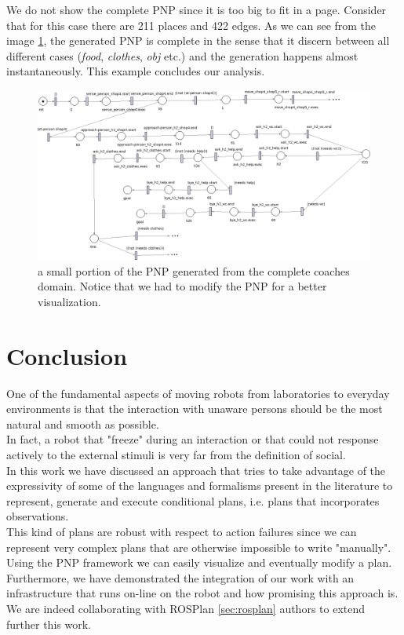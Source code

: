 \documentclass[pdftex,12pt,a4paper]{report}
\begin{document}
\noindent We do not show the complete PNP since it is too big to fit in a page. Consider that for this case there are 211 places and 422 edges. As we can see from the image \ref{fig:rosplan_ex2}, the generated PNP is complete in the sense that it discern between all different cases (\textit{food}, \textit{clothes}, \textit{obj} etc.) and the generation happens almost instantaneously. This example concludes our analysis.

\begin{figure}[H]
	\centering
	\includegraphics[scale=0.5,angle=270, trim=50mm 0mm 0mm 0mm]{images/rosplan_coaches2.png}
	\caption{a small portion of the PNP generated from the complete coaches domain. Notice that we had to modify the PNP for a better visualization.}
	\label{fig:rosplan_ex2}
\end{figure}

\chapter{Conclusion}\label{sec:conclusion}
One of the fundamental aspects of moving robots from laboratories to everyday environments is that the interaction with unaware persons should be the most natural and smooth as possible.\\
In fact, a robot that "freeze" during an interaction or that could not response actively to the external stimuli is very far from the definition of social.\\
In this work we have discussed an approach that tries to take advantage of the expressivity of some of the languages and formalisms present in the literature to represent, generate and execute conditional plans, i.e. plans that incorporates observations.\\
This kind of plans are robust with respect to action failures since we can represent very complex plans that are otherwise impossible to write "manually".
Using the PNP framework we can easily visualize and eventually modify a plan.\\
Furthermore, we have demonstrated the integration of our work with an infrastructure that runs on-line on the robot and how promising this approach is. We are indeed collaborating with ROSPlan \ref{sec:rosplan} authors to extend further this work. 
\end{document}
